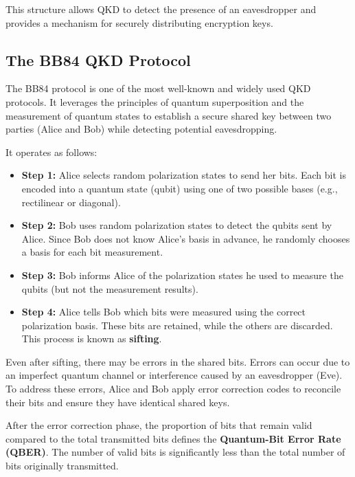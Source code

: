 This structure allows QKD to detect the presence of an eavesdropper
and provides a mechanism for securely distributing encryption keys.

\subsection{The BB84 QKD Protocol}

The BB84 protocol is one of the most well-known and widely used QKD
protocols. It leverages the principles of quantum superposition and
the measurement of quantum states to establish a secure shared key
between two parties (Alice and Bob) while detecting potential
eavesdropping.

It operates as follows:
\begin{itemize}
  \item \textbf{Step 1:} Alice selects random polarization states to
    send her bits. Each bit is encoded into a quantum state (qubit)
    using one of two possible bases (e.g., rectilinear or diagonal).

  \item \textbf{Step 2:} Bob uses random polarization states to detect
    the qubits sent by Alice. Since Bob does not know Alice's basis in
    advance, he randomly chooses a basis for each bit measurement.

  \item \textbf{Step 3:} Bob informs Alice of the polarization states
    he used to measure the qubits (but not the measurement results). 

  \item \textbf{Step 4:} Alice tells Bob which bits were measured
    using the correct polarization basis. These bits are retained,
    while the others are discarded. This process is known as
    \textbf{sifting}.
\end{itemize}

Even after sifting, there may be errors in the shared bits. Errors can
occur due to an imperfect quantum channel or interference caused by an
eavesdropper (Eve). To address these errors, Alice and Bob apply error
correction codes to reconcile their bits and ensure they have
identical shared keys.

After the error correction phase, the proportion of bits that remain
valid compared to the total transmitted bits defines the
\textbf{Quantum-Bit Error Rate (QBER)}. The number of valid bits is
significantly less than the total number of bits originally
transmitted.

